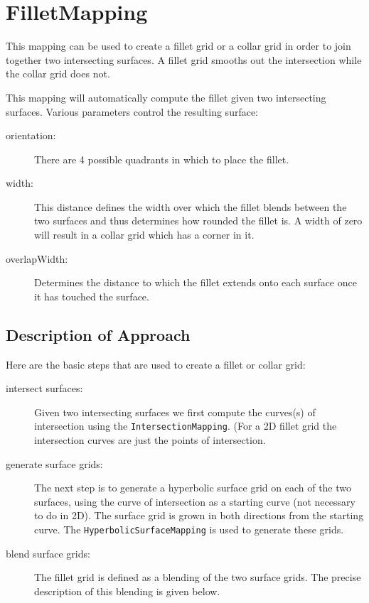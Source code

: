 \section{FilletMapping}

This mapping can be used to create a fillet grid or a collar grid in order to join
together two intersecting surfaces. A fillet grid smooths out the intersection while
the collar grid does not.

This mapping will automatically compute the fillet given two intersecting surfaces. 
Various parameters control the resulting surface:
\begin{description}
  \item[orientation:] There are 4 possible quadrants in which to place the fillet.
  \item[width:] This distance defines the width over which the fillet blends between
     the two surfaces and thus determines how rounded the fillet is. A width of zero
     will result in a collar grid which has a corner in it.
  \item[overlapWidth:] Determines the distance to which the fillet extends onto each
  surface once it has touched the surface.
\end{description}


\subsection{Description of Approach}

Here are the basic steps that are used to create a fillet or collar grid:
\begin{description}
 \item[intersect surfaces:] Given two intersecting surfaces we first compute the
   curves(s) of intersection using the {\tt IntersectionMapping}. (For a 2D fillet grid
   the intersection curves are just the points of intersection.
 \item[generate surface grids:] The next step is to generate a hyperbolic surface grid
    on each of the two surfaces, using the curve of intersection as a starting curve (not necessary
    to do in 2D). The surface grid is grown in both directions from the starting curve. The 
    {\tt HyperbolicSurfaceMapping} is used to generate these grids.
 \item[blend surface grids:] The fillet grid is defined as a blending of the two surface grids. 
    The precise description of this blending is given below.
\end{description}


